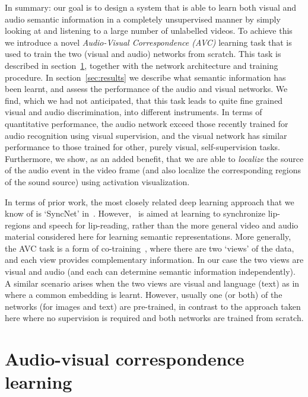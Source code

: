 \documentclass[10pt,twocolumn,letterpaper]{article}
\begin{document}
In summary: our goal is to design a system that is able to learn both
visual and audio semantic information in a completely unsupervised
manner by simply looking at and listening to a large number of
unlabelled videos. To achieve this we introduce a novel 
\emph{Audio-Visual Correspondence (AVC)} learning task that is used
to train the two (visual and audio) networks from scratch. 
This task is described
in section~\ref{sec:approach}, together with the network architecture
and training procedure. In section~\ref{sec:results} we describe what
semantic information has been learnt, and assess the performance of
the audio and visual networks. We find, which we had not anticipated,
that this task leads to quite fine grained visual and audio
discrimination, \eg into different instruments. In terms of
quantitative performance, the audio network exceed those recently
trained for audio recognition using visual supervision, 
and the visual network has similar
performance to those trained for other, purely visual,
self-supervision tasks. Furthermore, we show, as an added benefit, that we are
able to {\em localize} the source of the audio event in the video frame (and
also localize 
the corresponding regions of the sound source) using activation
visualization.

In terms of prior work, the most closely related deep learning
approach that we know of is `SyncNet' in~\cite{Chung16a}. However,
\cite{Chung16a}~is aimed at learning to synchronize lip-regions and speech
for lip-reading, rather than the more general video and audio material
considered here for learning semantic representations.
More generally, the AVC task is a form of co-training~\cite{Blum98}, where there
are two `views' of the data, and each view provides complementary information.
In our case the two views are visual and audio (and each can determine
semantic information independently). A similar scenario arises when
the two views are visual and language (text) as
in~\cite{Frome13,Lei15,Socher13} where a common embedding is learnt. However, usually
one (or both) of the networks (for images and text) are pre-trained,  in contrast to the
approach taken here where no supervision is required and both
networks are trained from scratch.

%
%
%
%
%
%

%
%
%
%
%
%


%
\section{Audio-visual correspondence learning}
\label{sec:approach}
\label{sec:avc}
\end{document}
